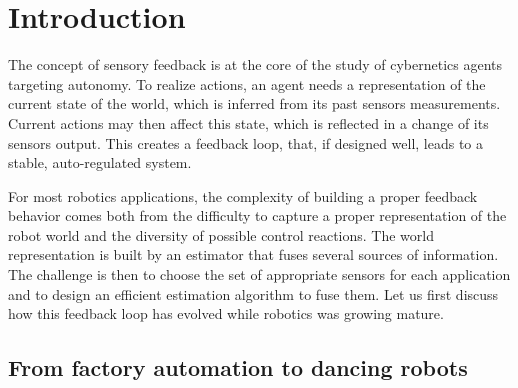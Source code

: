 \chapter{Introduction}



The concept of sensory feedback is at the core of the study of cybernetics agents targeting autonomy. To realize
actions, an agent needs a representation of the current state of the world, which is inferred from its past sensors measurements. Current actions may 
then affect this state, which is reflected in a change of its sensors output. This creates a feedback loop, that, if designed well, leads to a stable, 
auto-regulated system.

For most robotics applications, the complexity of building a proper feedback behavior comes both from the difficulty
to capture a proper representation of the robot world and the diversity of possible control reactions. 
The world representation is built by an estimator that fuses several sources of information. 
The challenge is then to choose the set of appropriate sensors for each application and to design an efficient estimation algorithm to fuse them.
Let us first discuss how this feedback loop has evolved while robotics was growing mature.




\section{From factory automation to dancing robots}


